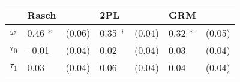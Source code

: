 \begin{tabular}{lllllll}
  \hline
  & Rasch &  & 2PL &  & GRM &  \\ 
   \hline
$\omega$ & 0.46 * & (0.06) & 0.35 * & (0.04) & 0.32 * & (0.05) \\ 
  $\tau_0$ & --0.01 & (0.04) & 0.02 & (0.04) & 0.03 & (0.04) \\ 
  $\tau_1$ & 0.03 & (0.04) & 0.06 & (0.04) & 0.04 & (0.04) \\ 
   \hline
\end{tabular}

